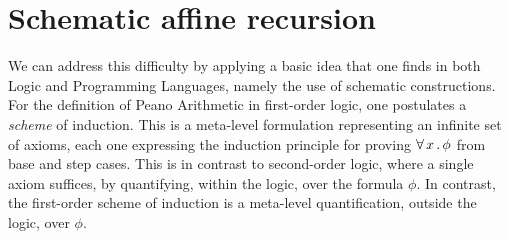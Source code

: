 \documentclass{article}
\begin{document}
\section{Schematic affine recursion}

We can address this difficulty by applying a basic idea that one finds
in both Logic and Programming Languages, namely the use of schematic
constructions.  For the definition of Peano Arithmetic in first-order
logic, one postulates a \emph{scheme} of induction.  This is a
meta-level formulation representing an infinite set of axioms, each
one expressing the induction principle for proving $\forall\, x\,.\, \phi$
from base and step cases.  This is in contrast to second-order logic,
where a single axiom suffices, by quantifying, within the logic, over
the formula $\phi$.  In contrast, the first-order scheme of induction
is a meta-level quantification, outside the logic, over $\phi$.
\end{document}
